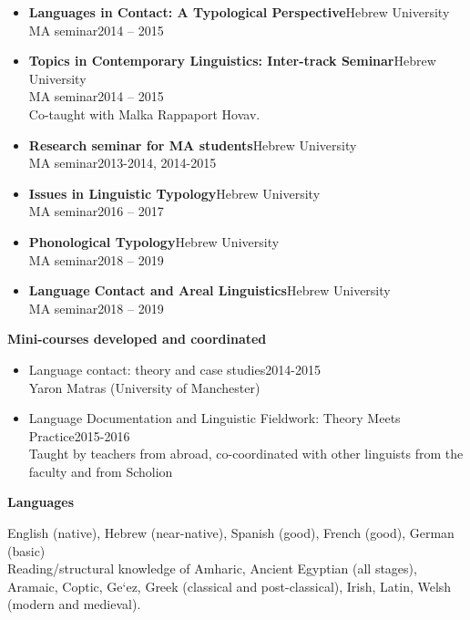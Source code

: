 \documentclass[letterpaper,11pt]{article}
\newcommand{\resheading}[1]{
\vspace*{6pt}
{\large \colorbox{mygrey}{\begin{minipage}{\textwidth}{\textbf{#1 \vphantom{p\^{E}}}}\end{minipage}}}
}
\begin{document}
\begin{itemize}
\item \textbf{Languages in Contact: A Typological Perspective}\hfill {Hebrew University}\\{MA seminar}\hfill{2014 -- 2015}

\item \textbf{Topics in Contemporary Linguistics: Inter-track Seminar}\hfill{Hebrew University}\\{MA seminar}\hfill{2014 -- 2015}\\Co-taught with Malka Rappaport Hovav.
	
\item \textbf{Research seminar for MA students}\hfill{Hebrew University}\\{MA seminar}\hfill{2013-2014, 2014-2015}
	
\item \textbf{{Issues in Linguistic Typology}}\hfill{Hebrew University}\\{MA seminar}\hfill{2016 -- 2017}
	
\item \textbf{Phonological Typology}\hfill{Hebrew University}\\{MA seminar}\hfill{2018 -- 2019}
	
\item \textbf{Language Contact and Areal Linguistics}\hfill{Hebrew University}\\{MA seminar}\hfill{2018 -- 2019}
\end{itemize}

\begin{flushleft}
\textbf{Mini-courses developed and coordinated}
\end{flushleft}
\begin{itemize}
    \item {Language contact: theory and case studies}\hfill{2014-2015}\\Yaron Matras (University of Manchester)
\item {Language Documentation and Linguistic Fieldwork: Theory Meets Practice}\hfill{2015-2016}\\Taught by teachers from abroad, co-coordinated with other linguists from the faculty and from Scholion
\end{itemize}



\resheading{Languages} 

\raggedright
English (native), Hebrew (near-native), Spanish (good), French (good), German (basic)\\
Reading/structural knowledge of Amharic, Ancient Egyptian (all stages), Aramaic, Coptic, Ge`ez, Greek (classical and post-classical), Irish, Latin, Welsh (modern and medieval).
\end{document}
